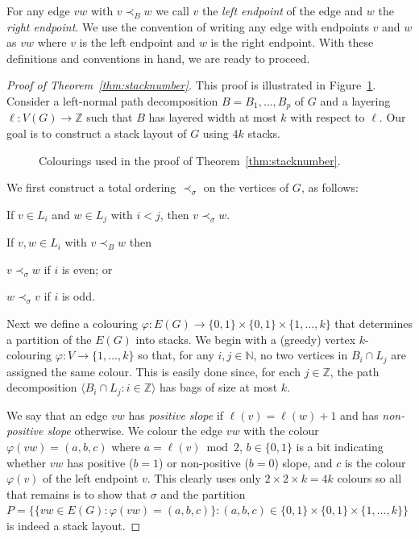 \documentclass{jgaa-art}
\newcommand{\Z}{\mathbb{Z}}
\newcommand{\N}{\mathbb{N}}
\newcommand{\figlabel}[1]{\label{fig:#1}}
\newcommand{\figref}[1]{\mbox{Figure~\ref{fig:#1}}}
\newcommand{\thmref}[1]{Theorem~\ref{thm:#1}}
\begin{document}
For any edge $vw$ with $v\prec_B w$ we call $v$ the \emph{left endpoint} of the edge and $w$ the \emph{right endpoint}.  We use the convention of writing any edge with endpoints $v$ and $w$ as $vw$ where $v$ is the left endpoint and $w$ is the right endpoint.  With these definitions and conventions in hand, we are ready to proceed.

\begin{proof}[Proof of \thmref{stacknumber}]
  This proof is illustrated in \figref{stack-layout}.
  Consider a left-normal path decomposition $B=B_1,\ldots,B_p$ of $G$ and a layering $\ell:V(G)\to\Z$ such that $B$ has layered width at most $k$ with respect to $\ell$.  Our goal is to construct a stack layout of $G$ using $4k$ stacks.
  \begin{figure}
      \caption{Colourings used in the proof of \thmref{stacknumber}.}
      \figlabel{stack-layout}
  \end{figure}

  We first construct a total ordering $\prec_\sigma$ on the vertices of $G$, as follows:
  \begin{compactenum}[(Property 1)]
    \item If $v\in L_i$ and $w\in L_j$ with $i < j$, then $v\prec_\sigma w$.
    \item If $v,w\in L_i$ with $v \prec_B w$ then
    \begin{compactenum}[(a)]
      \item $v\prec_\sigma w$ if $i$ is even; or
      \item $w\prec_\sigma v$ if $i$ is odd.
    \end{compactenum}
  \end{compactenum}

  Next we define a colouring $\varphi:E(G)\to\{0,1\}\times\{0,1\}\times\{1,\ldots,k\}$ that determines a partition of the $E(G)$ into stacks.  We begin with a (greedy) vertex $k$-colouring $\varphi:V\to \lbrace 1,\ldots,k\rbrace$ so that, for any $i,j\in\N$, no two vertices in $B_i\cap L_j$ are assigned the same colour. This is easily done since, for each $j\in\Z$, the path decomposition $\langle B_i\cap L_j : i\in \Z\rangle$ has bags of size at most $k$.

  We say that an edge $vw$ has \emph{positive slope} if $\ell(v)=\ell(w)+1$ and has \emph{non-positive slope} otherwise.  We colour the edge $vw$ with the colour $\varphi(vw)=(a,b,c)$ where $a=\ell(v)\bmod 2$, $b\in\{0,1\}$ is a bit indicating whether $vw$ has positive ($b=1$) or non-positive ($b=0$) slope, and $c$ is the colour $\varphi(v)$ of the left endpoint $v$.  This clearly uses only $2\times2\times k=4k$ colours so all that remains is to show that
  $\sigma$ and the partition $P=\{\{vw\in E(G):\varphi(vw)=(a,b,c)\}:(a,b,c)\in \{0,1\}\times\{0,1\}\times\{1,\ldots,k\}\}$  is indeed a stack layout.


\end{proof}
\end{document}

